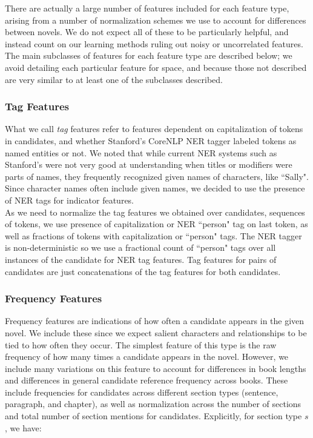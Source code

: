 \documentclass[12pt]{article}
\begin{document}
        There are actually a large number of features included for each feature type, arising from a number
        of normalization schemes we use to account for differences between novels. We do not expect
        all of these to be particularly helpful, and instead count on our learning methods ruling out
        noisy or uncorrelated features. The main subclasses of features for each feature type 
        are described below; we avoid detailing each particular feature for space, and because
        those not described are very similar to at least one of the subclasses described.

        \subsubsection{Tag Features}
        
        What we call \emph{tag} features refer to features dependent on capitalization of tokens in
        candidates, and whether Stanford's CoreNLP NER tagger \cite{finkel2005incorporating} labeled tokens as 
        named entities or not. We noted that while current NER systems such as Stanford's were
        not very good at understanding when titles or modifiers were parts of names, they frequently
        recognized given names of characters, like ``Sally". Since character names often 
        include given names, we decided to use the presence of NER tags for indicator features. \\

        As we need to normalize the tag features we obtained over candidates, sequences of tokens,
        we use presence of capitalization or NER ``person" tag on last token, as well as fractions
        of tokens with capitalization or ``person" tags. The NER tagger is non-deterministic so
        we use a fractional count of ``person" tags over all instances of the candidate for NER
        tag features. Tag features for pairs of candidates are just concatenations of the tag
        features for both candidates.

        \subsubsection{Frequency Features}

        Frequency features are indications of how often a candidate appears in the given novel. We include 
        these since we expect salient characters and relationships to be tied to how often they occur. 
        The simplest feature of this type is the raw frequency of how many times a candidate
        appears in the novel. However, we include many variations on this feature to account for
        differences in book lengths and differences in general candidate reference frequency across books.
        These include frequencies for candidates across different section types (sentence, paragraph, and chapter), as well
        as normalization across the number of sections and total number of section mentions for candidates.
        Explicitly, for section type $s$, we have:
        
\end{document}
